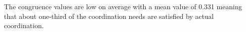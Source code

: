 The congruence values are low on average with a mean value of 0.331 meaning that about one-third of the coordination needs are satisfied by actual coordination.


%

